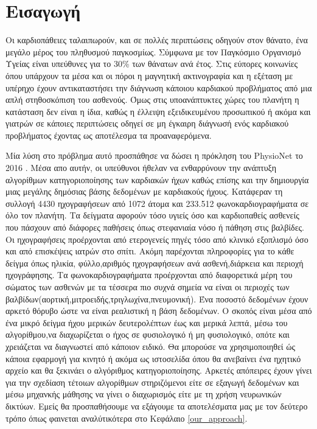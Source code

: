\section{Εισαγωγή}
Οι καρδιοπάθειες ταλαιπωρούν, και σε πολλές περιπτώσεις οδηγούν στον θάνατο, ένα
μεγάλο μέρος του πληθυσμού παγκοσμίως. Σύμφωνα με τον Παγκόσμιο Οργανισμό Υγείας\cite{who}
είναι υπεύθυνες για το 30\% των θάνατων ανά έτος. Στις εύπορες κοινωνίες όπου
υπάρχουν τα μέσα και οι πόροι η μαγνητική ακτινογραφία και η εξέταση με υπέρηχο
έχουν αντικαταστήσει την διάγνωση κάποιου καρδιακού προβλήματος από μια απλή
στηθοσκόπιση του ασθενούς. Όμως στις υποανάπτυκτες χώρες του πλανήτη η κατάσταση
δεν είναι η ίδια, καθώς η έλλειψη εξειδικευμένου προσωπικού ή ακόμα και γιατρών
σε κάποιες περιπτώσεις οδηγεί σε μη έγκαιρη διάγνωσή ενός καρδιακού προβλήματος
έχοντας ως αποτέλεσμα τα προαναφερόμενα.

Μία λύση στο πρόβλημα αυτό προσπάθησε να δώσει η πρόκληση του PhysioNet το 2016
\cite{clifford2016classification}. Μέσα απο αυτήν, οι υπεύθυνοι ήθελαν να
ενθαρρύνουν την ανάπτυξη αλγορίθμων κατηγοριοποίησης των καρδιακών ήχων καθώς
επίσης και την δημιουργία μιας μεγάλης δημόσιας βάσης δεδομένων με καρδιακούς
ήχους. Κατάφεραν τη συλλογή 4430 ηχογραφήσεων από 1072 άτομα και 233.512
φωνοκαρδιογραφήματα σε όλο τον πλανήτη.  Τα δείγματα αφορούν τόσο υγιείς όσο και
καρδιοπαθείς ασθενείς που πάσχουν από διάφορες παθήσεις όπως στεφανιαία νόσο ή
πάθηση στις βαλβίδες. Οι ηχογραφήσεις προέρχονται από ετερογενείς πηγές τόσο από
κλινικό εξοπλισμό όσο και από επισκέψεις ιατρών στο σπίτι. Ακόμη παρέχονται
πληροφορίες για το κάθε δείγμα όπως ηλικία, φύλλο,αριθμός ηχογραφήσεων ανά
ασθενή,διάρκεια και περιοχή ηχογράφησης. Τα φωνοκαρδιογραφήματα προέρχονται από
διαφορετικά μέρη του σώματος των ασθενών με τα τέσσερα πιο συχνά σημεία να είναι
οι περιοχές των βαλβίδων(αορτική,μιτροειδής,τριγλωχίνα,πνευμονική). Ένα ποσοστό
δεδομένων έχουν αρκετό θόρυβο ώστε να είναι ρεαλιστική η βάση δεδομένων.  Ο
σκοπός είναι μέσα από ένα μικρό δείγμα ήχου μερικών δευτερολέπτων έως και μερικά
λεπτά, μέσω του αλγορίθμου,να διαχωρίζεται ο ήχος σε φυσιολογικό ή μη
φυσιολογικό, οπότε και χρειάζεται να διαγνωστεί από κάποιον ειδικό. Θα μπορούσε
να χρησιμοποιηθεί ώς κάποια εφαρμογή για κινητό ή ακόμα ως ιστοσελίδα όπου θα
ανεβαίνει ένα ηχητικό αρχείο και θα ξεκινάει ο αλγόριθμος κατηγοριοποίησης.
Αρκετές απόπειρες έχουν γίνει για την σχεδίαση τέτοιων αλγορίθμων στηριζόμενοι
είτε σε εξαγωγή δεδομένων και μέσω μηχανκής μάθησης να γίνει ο διαχωρισμός είτε
με τη χρήση νευρωνικών δικτύων. Εμείς θα προσπαθήσουμε να εξάγουμε τα
αποτελέσματα μας με τον δεύτερο τρόπο όπως φαινεται αναλύτικότερα στο Κεφάλαιο
\ref{our_approach}.

